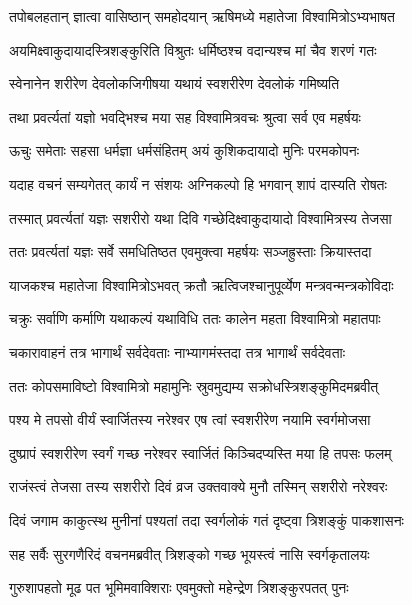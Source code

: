 
\twolineshloka
{तपोबलहतान् ज्ञात्वा वासिष्ठान् समहोदयान्}
{ऋषिमध्ये महातेजा विश्वामित्रोऽभ्यभाषत} %

\twolineshloka
{अयमिक्ष्वाकुदायादस्त्रिशङ्कुरिति विश्रुतः}
{धर्मिष्ठश्च वदान्यश्च मां चैव शरणं गतः} %

\twolineshloka
{स्वेनानेन शरीरेण देवलोकजिगीषया}
{यथायं स्वशरीरेण देवलोकं गमिष्यति} %

\twolineshloka
{तथा प्रवर्त्यतां यज्ञो भवद्भिश्च मया सह}
{विश्वामित्रवचः श्रुत्वा सर्व एव महर्षयः} %

\twolineshloka
{ऊचुः समेताः सहसा धर्मज्ञा धर्मसंहितम्}
{अयं कुशिकदायादो मुनिः परमकोपनः} %

\twolineshloka
{यदाह वचनं सम्यगेतत् कार्यं न संशयः}
{अग्निकल्पो हि भगवान् शापं दास्यति रोषतः} %

\twolineshloka
{तस्मात् प्रवर्त्यतां यज्ञः सशरीरो यथा दिवि}
{गच्छेदिक्ष्वाकुदायादो विश्वामित्रस्य तेजसा} %

\twolineshloka
{ततः प्रवर्त्यतां यज्ञः सर्वे समधितिष्ठत}
{एवमुक्त्वा महर्षयः सञ्जह्रुस्ताः क्रियास्तदा} %

\twolineshloka
{याजकश्च महातेजा विश्वामित्रोऽभवत् क्रतौ}
{ऋत्विजश्चानुपूर्व्येण मन्त्रवन्मन्त्रकोविदाः} %

\twolineshloka
{चक्रुः सर्वाणि कर्माणि यथाकल्पं यथाविधि}
{ततः कालेन महता विश्वामित्रो महातपाः} %

\twolineshloka
{चकारावाहनं तत्र भागार्थं सर्वदेवताः}
{नाभ्यागमंस्तदा तत्र भागार्थं सर्वदेवताः} %

\twolineshloka
{ततः कोपसमाविष्टो विश्वामित्रो महामुनिः}
{स्रुवमुद्यम्य सक्रोधस्त्रिशङ्कुमिदमब्रवीत्} %

\twolineshloka
{पश्य मे तपसो वीर्यं स्वार्जितस्य नरेश्वर}
{एष त्वां स्वशरीरेण नयामि स्वर्गमोजसा} %

\twolineshloka
{दुष्प्रापं स्वशरीरेण स्वर्गं गच्छ नरेश्वर}
{स्वार्जितं किञ्चिदप्यस्ति मया हि तपसः फलम्} %

\twolineshloka
{राजंस्त्वं तेजसा तस्य सशरीरो दिवं व्रज}
{उक्तवाक्ये मुनौ तस्मिन् सशरीरो नरेश्वरः} %

\twolineshloka
{दिवं जगाम काकुत्स्थ मुनीनां पश्यतां तदा}
{स्वर्गलोकं गतं दृष्ट्वा त्रिशङ्कुं पाकशासनः} %

\twolineshloka
{सह सर्वैः सुरगणैरिदं वचनमब्रवीत्}
{त्रिशङ्को गच्छ भूयस्त्वं नासि स्वर्गकृतालयः} %

\twolineshloka
{गुरुशापहतो मूढ पत भूमिमवाक्शिराः}
{एवमुक्तो महेन्द्रेण त्रिशङ्कुरपतत् पुनः} %

